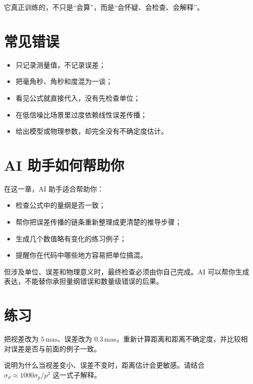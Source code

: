 它真正训练的，不只是“会算”，而是“会怀疑、会检查、会解释”。

\section{常见错误}

\begin{warnbox}[误差与单位中的典型问题]
\begin{itemize}
    \item 只记录测量值，不记录误差；
    \item 把毫角秒、角秒和度混为一谈；
    \item 看见公式就直接代入，没有先检查单位；
    \item 在低信噪比场景里过度依赖线性误差传播；
    \item 给出模型或物理参数，却完全没有不确定度估计。
\end{itemize}
\end{warnbox}

\section{AI 助手如何帮助你}

在这一章，AI 助手适合帮助你：

\begin{itemize}
    \item 检查公式中的量纲是否一致；
    \item 帮你把误差传播的链条重新整理成更清楚的推导步骤；
    \item 生成几个数值略有变化的练习例子；
    \item 提醒你在代码中哪些地方容易把单位搞混。
\end{itemize}

但涉及单位、误差和物理意义时，最终检查必须由你自己完成。AI 可以帮你生成表达，不能替你承担量纲错误和数量级错误的后果。

\section{练习}

\begin{exercisebox}[基础练习]
把视差改为 $5\,\mathrm{mas}$、误差改为 $0.3\,\mathrm{mas}$，重新计算距离和距离不确定度，并比较相对误差是否与前面的例子一致。
\end{exercisebox}

\begin{exercisebox}[进阶练习]
说明为什么当视差变小、误差不变时，距离估计会更敏感。请结合 $\sigma_d \approx 1000\sigma_p/p^2$ 这一式子解释。
\end{exercisebox}

